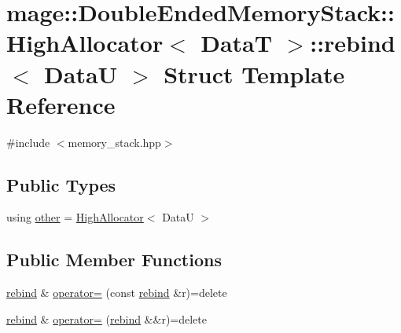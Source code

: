 \hypertarget{structmage_1_1_double_ended_memory_stack_1_1_high_allocator_1_1rebind}{}\section{mage\+:\+:Double\+Ended\+Memory\+Stack\+:\+:High\+Allocator$<$ DataT $>$\+:\+:rebind$<$ DataU $>$ Struct Template Reference}
\label{structmage_1_1_double_ended_memory_stack_1_1_high_allocator_1_1rebind}


{\ttfamily \#include $<$memory\+\_\+stack.\+hpp$>$}

\subsection*{Public Types}
\begin{DoxyCompactItemize}
\item 
using \hyperlink{structmage_1_1_double_ended_memory_stack_1_1_high_allocator_1_1rebind_aee127399c76826ea9b23986ee10f19fa}{other} = \hyperlink{structmage_1_1_double_ended_memory_stack_1_1_high_allocator}{High\+Allocator}$<$ DataU $>$
\end{DoxyCompactItemize}
\subsection*{Public Member Functions}
\begin{DoxyCompactItemize}
\item 
\hyperlink{structmage_1_1_double_ended_memory_stack_1_1_high_allocator_1_1rebind}{rebind} \& \hyperlink{structmage_1_1_double_ended_memory_stack_1_1_high_allocator_1_1rebind_a50688a7791fcedde0fd16064dbfa3d13}{operator=} (const \hyperlink{structmage_1_1_double_ended_memory_stack_1_1_high_allocator_1_1rebind}{rebind} \&r)=delete
\item 
\hyperlink{structmage_1_1_double_ended_memory_stack_1_1_high_allocator_1_1rebind}{rebind} \& \hyperlink{structmage_1_1_double_ended_memory_stack_1_1_high_allocator_1_1rebind_aff84f83ff696b9e7c2063a492c5256a9}{operator=} (\hyperlink{structmage_1_1_double_ended_memory_stack_1_1_high_allocator_1_1rebind}{rebind} \&\&r)=delete
\end{DoxyCompactItemize}
